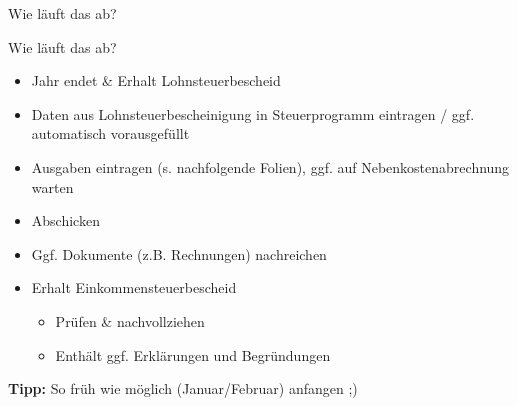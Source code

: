 \documentclass{beamer}
\begin{document}
\begin{frame}{Wie läuft das ab?}{}
\begin{center}
				\end{center}
			\end{frame}
		
			\begin{frame}{Wie läuft das ab?}
				\begin{itemize}
					\item Jahr endet \& Erhalt Lohnsteuerbescheid
					\item Daten aus Lohnsteuerbescheinigung in Steuerprogramm eintragen / ggf. automatisch vorausgefüllt
					\item Ausgaben eintragen (s. nachfolgende Folien), ggf. auf Nebenkostenabrechnung warten
					\item Abschicken
					\item Ggf. Dokumente (z.B. Rechnungen) nachreichen
					\item Erhalt Einkommensteuerbescheid
					\begin{itemize}
						\item Prüfen \& nachvollziehen
						\item Enthält ggf. Erklärungen und Begründungen
					\end{itemize}
				\end{itemize}\n
				\textbf{Tipp:} So früh wie möglich (Januar/Februar) anfangen ;)
			\end{frame}
		
\end{document}
